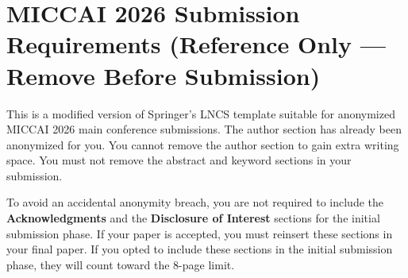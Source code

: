 \documentclass[runningheads]{llncs}
\begin{document}
\newpage
\appendix
\section*{MICCAI 2026 Submission Requirements (Reference Only --- Remove Before Submission)}

This is a modified version of Springer's LNCS template suitable for anonymized MICCAI 2026 main conference submissions. The author section has already been anonymized for you.  You cannot remove the author section to gain extra writing space.  You must not remove the abstract and keyword sections in your submission.

To avoid an accidental anonymity breach, you are not required to include the \textbf{Acknowledgments} and the \textbf{Disclosure of Interest} sections for the initial submission phase.  If your paper is accepted, you must reinsert these sections in your final paper.  If you opted to include these sections in the initial submission phase, they will count toward the 8-page limit.
\end{document}
